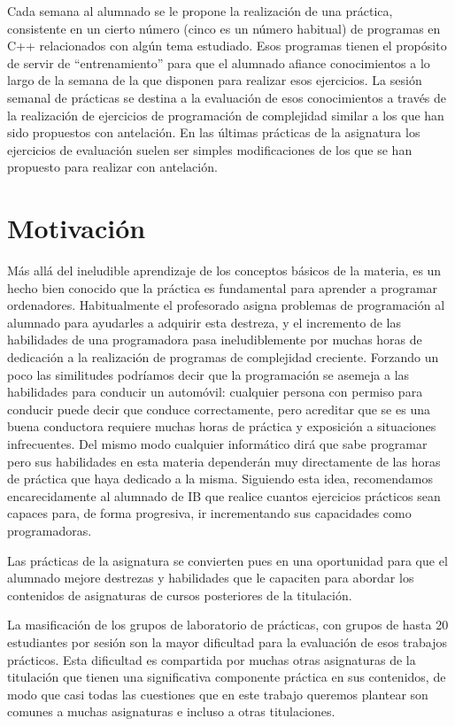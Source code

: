 \documentclass[twocolumn,twoside,a4paper, 10pt]{article}
\begin{document}
Cada semana al alumnado se le propone la realización de una práctica, consistente en un cierto número (cinco
es un número habitual) de programas en C++ relacionados con algún tema estudiado.
Esos programas tienen el propósito de servir de ``entrenamiento'' para que el alumnado afiance conocimientos a
lo largo de la semana de la que disponen para realizar esos ejercicios.
La sesión semanal de prácticas se destina a la evaluación de esos conocimientos a través de la realización de
ejercicios de programación de complejidad similar a los que han sido propuestos con antelación.
En las últimas prácticas de la asignatura los ejercicios de evaluación suelen ser simples modificaciones de 
los que se han propuesto para realizar con antelación.


\section{Motivación}
Más allá del ineludible aprendizaje de los conceptos básicos de la materia, 
es un hecho bien conocido que la práctica es fundamental para aprender a programar ordenadores. 
Habitualmente el profesorado asigna problemas de programación al alumnado para ayudarles a adquirir esta 
destreza, y el incremento de las habilidades de una programadora pasa ineludiblemente por muchas horas de dedicación 
a la realización de programas de complejidad creciente.
Forzando un poco las similitudes podríamos decir que la programación se asemeja a las habilidades para
conducir un automóvil: cualquier persona con permiso para conducir puede decir que conduce correctamente, pero
acreditar que se es una buena conductora requiere muchas horas de práctica y exposición a situaciones
infrecuentes.
Del mismo modo cualquier informático dirá que sabe programar pero sus habilidades en esta materia dependerán
muy directamente de las horas de práctica que haya dedicado a la misma.
Siguiendo esta idea, recomendamos encarecidamente al alumnado de IB que realice cuantos ejercicios prácticos
sean capaces para, de forma progresiva, ir incrementando sus capacidades como programadoras.

Las prácticas de la asignatura se convierten pues en una oportunidad para que el alumnado mejore destrezas y
habilidades que le capaciten para abordar los contenidos de asignaturas de cursos posteriores de la
titulación.

La masificación de los grupos de laboratorio de prácticas, con grupos de hasta 20 estudiantes por sesión son
la mayor dificultad para la evaluación de esos trabajos prácticos.
Esta dificultad es compartida por muchas otras asignaturas de la titulación que tienen una significativa
componente práctica en sus contenidos, de modo que casi todas las cuestiones que en este trabajo queremos
plantear son comunes a muchas asignaturas e incluso a otras titulaciones.
\end{document}

